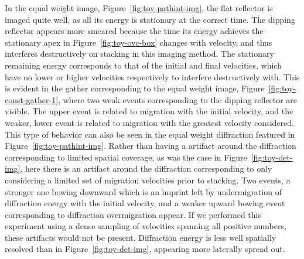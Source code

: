 In the equal weight image, Figure~\ref{fig:toy-pathint-img},  the flat reflector is imaged quite well, as all its energy is stationary at the correct time. The dipping reflector appears more smeared because the time its energy achieves the stationary apex in Figure~\ref{fig:toy-ovc-box} changes with velocity, and thus interferes destructively on stacking in this imaging method.  The stationary remaining energy corresponds to that of the initial and final velocities, which have no lower or higher velocities respectively to interfere destructively with. This is evident in the gather corresponding to the equal weight image, Figure~\ref{fig:toy-const-gather-1}, where two weak events corresponding to the dipping reflector are visible. The upper event is related to migration with the initial velocity, and the weaker, lower event is related to migration with the greatest velocity considered.  This type of behavior can also be seen in the equal weight diffraction featured in Figure~\ref{fig:toy-pathint-img}.  Rather than having a artifact around the diffraction corresponding to limited spatial coverage, as was the case in Figure~\ref{fig:toy-det-img}, here there is an artifact around the diffraction corresponding to only considering a limited set of migration velocities prior to stacking.  Two events, a stronger one bowing downward which is an imprint left by undermigration of diffraction energy with the initial velocity, and a weaker upward bowing event corresponding to diffraction overmigration appear. If we performed this experiment using a dense sampling of velocities spanning all positive numbers, these artifacts would not be present. Diffraction energy is less well spatially resolved than in Figure~\ref{fig:toy-det-img}, appearing more laterally spread out.



